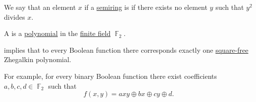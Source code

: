 \begin{definition}\label{def:square_free_element}
  We say that an element \( x \) if a \hyperref[def:semiring]{semiring} is  if there exists no element \( y \) such that \( y^2 \) divides \( x \).
\end{definition}

\begin{definition}\label{def:zhegalkin_polynomial}
  A  is a \hyperref[def:polynomial_algebra/polynomials]{polynomial} in the \hyperref[def:finite_field]{finite field} \( \BbbF_2 \).
\end{definition}
\begin{comments}
  \item {} implies that to every Boolean function there corresponds exactly one \hyperref[def:square_free_element]{square-free} Zhegalkin polynomial.

  For example, for every binary Boolean function there exist coefficients \( a, b, c, d \in \BbbF_2 \) such that
  \begin{equation}\label{eq:def:zhegalkin_polynomial/binary_polynomial}
    f(x, y) = axy \oplus bx \oplus cy \oplus d.
  \end{equation}
\end{comments}

